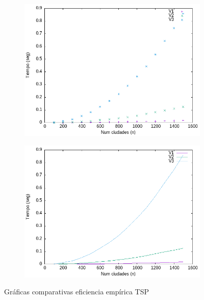 \documentclass{article}
\begin{document}
\begin{figure}[H]
    \centering
    \begin{subfigure}[b]{0.45\textwidth}
        \centering
        \includegraphics[width=\textwidth]{Problema4/imagenes/TSP_eficiencia_points.png}
    \end{subfigure}
    \hfill
    \begin{subfigure}[b]{0.45\textwidth}
        \centering
        \includegraphics[width=\textwidth]{Problema4/imagenes/TSP_eficiencia_line.png}
    \end{subfigure}
    \caption{Gráficas comparativas eficiencia empírica TSP}
    \label{fig:cmp_ef}
\end{figure}
\end{document}
